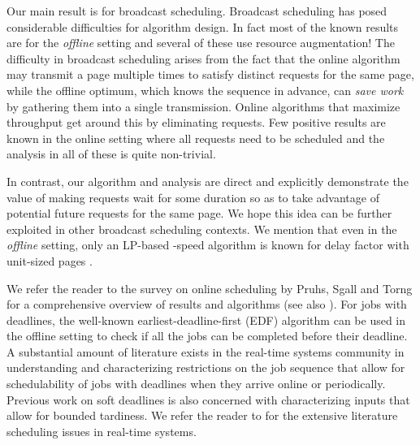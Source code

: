 \documentclass[11pt]{article}
\begin{document}
Our main result is for broadcast scheduling. Broadcast scheduling has
posed considerable difficulties for algorithm design. In fact most of
the known results are for the {\em offline} setting
\cite{KalyanasundaramPV00,ErlebachH02,GandhiKKW04,GandhiKPS06,BansalCS06,BansalCKN05}
and several of these use resource augmentation! The difficulty in
broadcast scheduling arises from the fact that the online algorithm
may transmit a page multiple times to satisfy distinct requests for
the same page, while the offline optimum, which knows the sequence in
advance, can {\em save work} by gathering them into a single
transmission. Online algorithms that maximize throughput
\cite{Kimc04,ChanLTW04,ZhengFCCPW06,ChrobakDJKK06} get around this by
eliminating requests. Few positive results are known in the online
setting where all requests need to be scheduled
\cite{BartalM00,EdmondsP03,EdmondsP04} and the analysis in all of
these is quite non-trivial.
\iffalse
Only two online results are of known for metrics
that require all requests to be scheduled. One is for maximum response
time where a factor of  is shown for FIFO (first-in first-out)
\cite{BartalM00,ChangEGK08}. The other is a -speed
-competitive algorithm for average response time by Edmonds
and Pruhs \cite{EdmondsP03}; their algorithm is an indirect reduction
to a complicated algorithm of Edmonds \cite{Edmonds00} for
non-clairvoyant scheduling.
\fi
In contrast, our algorithm and analysis
are direct and explicitly demonstrate the value of making requests
wait for some duration so as to take advantage of potential future
requests for the same page. We hope this idea can be further exploited
in other broadcast scheduling contexts. We mention that even in the
{\em offline} setting, only an LP-based -speed algorithm is known
for delay factor with unit-sized pages \cite{ChangEGK08}.

\medskip
{} We refer the reader to the survey on
online scheduling by Pruhs, Sgall and Torng \cite{PruhsST} for a
comprehensive overview of results and algorithms (see also
\cite{Pruhs07}). For jobs with deadlines, the well-known
earliest-deadline-first (EDF) algorithm can be used in the offline
setting to check if all the jobs can be completed before their
deadline. A substantial amount of literature exists in the real-time
systems community in understanding and characterizing restrictions on
the job sequence that allow for schedulability of jobs with deadlines
when they arrive online or periodically. Previous work on soft
deadlines is also concerned with characterizing inputs that allow for
bounded tardiness. We refer the reader to
\cite{RealtimeHandbook} for the extensive literature
scheduling issues in real-time systems.
\end{document}
